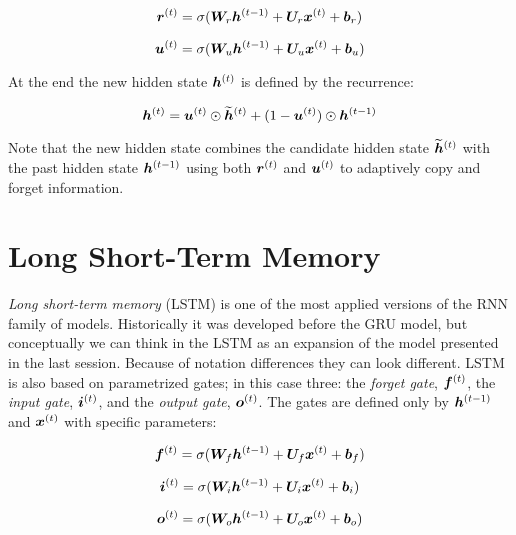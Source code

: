 \begin{equation}
\bm{r}^{(t)} = \sigma(\bm{W}_{r} \bm{h}^{(t-1)} + \bm{U}_{r} \bm{x}^{(t)} + \bm{b}_{r})
\end{equation}


\begin{equation}
\bm{u}^{(t)} = \sigma(\bm{W}_{u} \bm{h}^{(t-1)} + \bm{U}_{u} \bm{x}^{(t)} + \bm{b}_{u})
\end{equation}

At the end the new hidden state $\bm{h}^{(t)}$ is defined by the recurrence:

\begin{equation}
\bm{h}^{(t)} = \bm{u}^{(t)} \odot \bm{\widetilde{h}}^{(t)} + (1 - \bm{u}^{(t)}) \odot \bm{h}^{(t-1)} 
\end{equation}

Note that the new hidden state combines the candidate hidden state $\bm{\widetilde{h}}^{(t)}$ with the past hidden state $\bm{h}^{(t-1)}$ using both $\bm{r}^{(t)}$ and $\bm{u}^{(t)}$ to adaptively copy and forget information.

\section{Long Short-Term Memory}
\label{sec:LSTM}

\textit{Long short-term memory} (LSTM) is one of the most applied versions of the RNN family of models. Historically it was developed before the GRU model, but conceptually we can think in the LSTM as an expansion of the model presented in the last session. Because of notation differences they can look different. LSTM is also based on parametrized gates; in this case three: the \textit{forget gate}, $\bm{f}^{(t)}$, the \textit{input gate}, $\bm{i}^{(t)}$, and the \textit{output gate}, $\bm{o}^{(t)}$. The gates are defined only by $\bm{h}^{(t-1)}$ and $\bm{x}^{(t)}$ with specific parameters:


\begin{equation}
\bm{f}^{(t)} = \sigma(\bm{W}_{f} \bm{h}^{(t-1)} + \bm{U}_{f} \bm{x}^{(t)} + \bm{b}_{f})
\end{equation}

\begin{equation}
\bm{i}^{(t)} = \sigma(\bm{W}_{i} \bm{h}^{(t-1)} + \bm{U}_{i} \bm{x}^{(t)} + \bm{b}_{i})
\end{equation}

\begin{equation}
\bm{o}^{(t)} = \sigma(\bm{W}_{o} \bm{h}^{(t-1)} + \bm{U}_{o} \bm{x}^{(t)} + \bm{b}_{o})
\end{equation}

